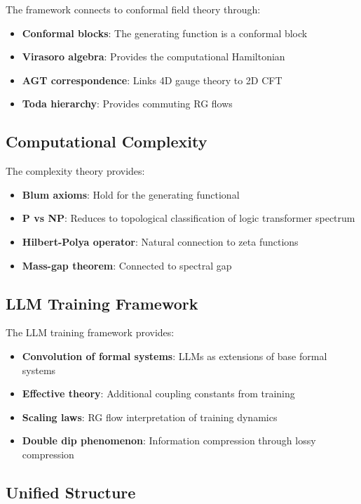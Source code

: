 The framework connects to conformal field theory through:
\begin{itemize}
\item \textbf{Conformal blocks}: The generating function is a conformal block
\item \textbf{Virasoro algebra}: Provides the computational Hamiltonian
\item \textbf{AGT correspondence}: Links 4D gauge theory to 2D CFT
\item \textbf{Toda hierarchy}: Provides commuting RG flows
\end{itemize}

\subsection{Computational Complexity}

The complexity theory provides:
\begin{itemize}
\item \textbf{Blum axioms}: Hold for the generating functional
\item \textbf{P vs NP}: Reduces to topological classification of logic transformer spectrum
\item \textbf{Hilbert-Polya operator}: Natural connection to zeta functions
\item \textbf{Mass-gap theorem}: Connected to spectral gap
\end{itemize}

\subsection{LLM Training Framework}

The LLM training framework provides:
\begin{itemize}
\item \textbf{Convolution of formal systems}: LLMs as extensions of base formal systems
\item \textbf{Effective theory}: Additional coupling constants from training
\item \textbf{Scaling laws}: RG flow interpretation of training dynamics
\item \textbf{Double dip phenomenon}: Information compression through lossy compression
\end{itemize}

\subsection{Unified Structure}


